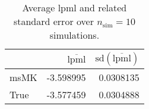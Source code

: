 \begin{table}[H]

\caption{Average lpml and related standard error over $n_{\text{sim}} = 10$ simulations.}
\centering
\begin{tabular}[t]{lrr}
\toprule
  & $\overbar{\text{lpml}}$ & $\text{sd}(\overbar{\text{lpml}})$\\
\midrule
msMK & -3.598995 & 0.0308135\\
True & -3.577459 & 0.0304888\\
\bottomrule
\end{tabular}
\end{table}